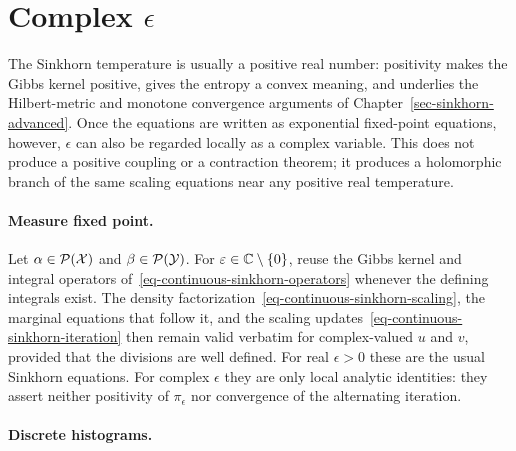 
\section{Complex \texorpdfstring{$\epsilon$}{epsilon}}
\label{sec-complex-epsilon}

The Sinkhorn temperature is usually a positive real number: positivity makes the Gibbs kernel positive, gives the entropy a convex meaning, and underlies the Hilbert-metric and monotone convergence arguments of Chapter~\ref{sec-sinkhorn-advanced}. Once the equations are written as exponential fixed-point equations, however, $\epsilon$ can also be regarded locally as a complex variable. This does not produce a positive coupling or a contraction theorem; it produces a holomorphic branch of the same scaling equations near any positive real temperature.

\paragraph{Measure fixed point.}

Let $\alpha\in\mathcal{P}(\mathcal{X})$ and $\beta\in\mathcal{P}(\mathcal{Y})$. For $\varepsilon\in\mathbb{C}\setminus\{0\}$, reuse the Gibbs kernel and integral operators of~\eqref{eq-continuous-sinkhorn-operators} whenever the defining integrals exist. The density factorization~\eqref{eq-continuous-sinkhorn-scaling}, the marginal equations that follow it, and the scaling updates~\eqref{eq-continuous-sinkhorn-iteration} then remain valid verbatim for complex-valued $u$ and $v$, provided that the divisions are well defined. For real $\epsilon>0$ these are the usual Sinkhorn equations. For complex $\epsilon$ they are only local analytic identities: they assert neither positivity of $\pi_\epsilon$ nor convergence of the alternating iteration.

\paragraph{Discrete histograms.}

